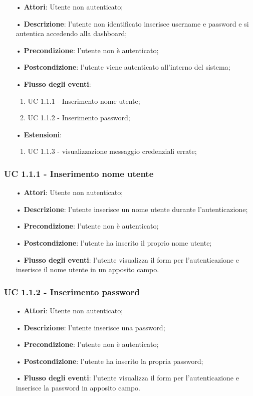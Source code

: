 \begin{itemize}
\item[•]\textbf{Attori}: Utente non autenticato;
\item[•]\textbf{Descrizione}:  l’utente non identificato inserisce username e password e si autentica accedendo alla dashboard;
\item[•]\textbf{Precondizione}: l’utente non è autenticato;
\item[•]\textbf{Postcondizione}: l’utente viene autenticato all’interno del sistema;
\item[•]\textbf{Flusso degli eventi}:
\begin{enumerate}
\item UC 1.1.1 - Inserimento nome utente;
\item UC 1.1.2 - Inserimento password;

\end{enumerate}
\item[•]\textbf{Estensioni}:
\begin{enumerate}
\item UC 1.1.3 - visualizzazione messaggio credenziali errate;
\end{enumerate}
\end{itemize}

\subsubsection{UC 1.1.1 - Inserimento nome utente}
\begin{itemize}
\item[•]\textbf{Attori}: Utente non autenticato;
\item[•]\textbf{Descrizione}: l’utente inserisce un nome utente durante l'autenticazione;
\item[•]\textbf{Precondizione}: l’utente non è autenticato;
\item[•]\textbf{Postcondizione}: l’utente ha inserito il proprio nome utente;
\item[•]\textbf{Flusso degli eventi}: l'utente visualizza il form per l'autenticazione e inserisce il nome utente in un apposito campo.

\end{itemize}

\subsubsection{UC 1.1.2 - Inserimento password}
\begin{itemize}
\item[•]\textbf{Attori}: Utente non autenticato;
\item[•]\textbf{Descrizione}: l’utente inserisce una password;
\item[•]\textbf{Precondizione}: l'utente non è autenticato;
\item[•]\textbf{Postcondizione}: l'utente ha inserito la propria password;
\item[•]\textbf{Flusso degli eventi}: l'utente visualizza il form per l'autenticazione e inserisce la password in apposito campo.
\end{itemize}

